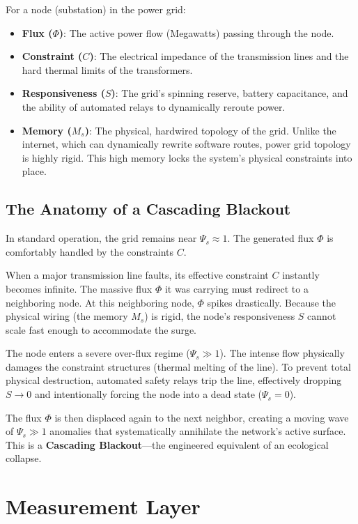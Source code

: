 \documentclass[11pt,a4paper]{article}
\begin{document}
For a node (substation) in the power grid:
\begin{itemize}
    \item \textbf{Flux ($\Phi$)}: The active power flow (Megawatts) passing through the node.
    \item \textbf{Constraint ($C$)}: The electrical impedance of the transmission lines and the hard thermal limits of the transformers.
    \item \textbf{Responsiveness ($S$)}: The grid's spinning reserve, battery capacitance, and the ability of automated relays to dynamically reroute power.
    \item \textbf{Memory ($M_s$)}: The physical, hardwired topology of the grid. Unlike the internet, which can dynamically rewrite software routes, power grid topology is highly rigid. This high memory locks the system's physical constraints into place.
\end{itemize}

\subsection{The Anatomy of a Cascading Blackout}
In standard operation, the grid remains near $\Psi_s \approx 1$. The generated flux $\Phi$ is comfortably handled by the constraints $C$.

When a major transmission line faults, its effective constraint $C$ instantly becomes infinite. The massive flux $\Phi$ it was carrying must redirect to a neighboring node. At this neighboring node, $\Phi$ spikes drastically. Because the physical wiring (the memory $M_s$) is rigid, the node's responsiveness $S$ cannot scale fast enough to accommodate the surge.

The node enters a severe over-flux regime ($\Psi_s \gg 1$). The intense flow physically damages the constraint structures (thermal melting of the line). To prevent total physical destruction, automated safety relays trip the line, effectively dropping $S \to 0$ and intentionally forcing the node into a dead state ($\Psi_s = 0$).

The flux $\Phi$ is then displaced again to the next neighbor, creating a moving wave of $\Psi_s \gg 1$ anomalies that systematically annihilate the network's active surface. This is a \textbf{Cascading Blackout}---the engineered equivalent of an ecological collapse.



\section{Measurement Layer}
\end{document}

